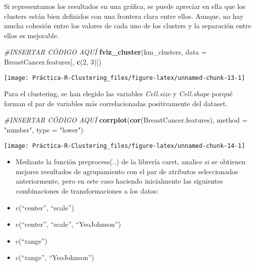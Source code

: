 \documentclass[
]{article}
\newenvironment{Shaded}{\begin{snugshade}}{\end{snugshade}}
\newcommand{\CommentTok}[1]{\textcolor[rgb]{0.56,0.35,0.01}{\textit{#1}}}
\newcommand{\DataTypeTok}[1]{\textcolor[rgb]{0.13,0.29,0.53}{#1}}
\newcommand{\DecValTok}[1]{\textcolor[rgb]{0.00,0.00,0.81}{#1}}
\newcommand{\KeywordTok}[1]{\textcolor[rgb]{0.13,0.29,0.53}{\textbf{#1}}}
\newcommand{\NormalTok}[1]{#1}
\newcommand{\StringTok}[1]{\textcolor[rgb]{0.31,0.60,0.02}{#1}}
\providecommand{\tightlist}{%
  \setlength{\itemsep}{0pt}\setlength{\parskip}{0pt}}
\begin{document}
Si representamos los resultados en una gráfica, se puede apreciar en
ella que los clusters están bien definidos con una frontera clara entre
ellos. Aunque, no hay mucha cohesión entre los valores de cada uno de
los clusters y la separación entre ellos es mejorable.

\begin{Shaded}
\begin{Highlighting}[]
\CommentTok{#INSERTAR CÓDIGO AQUÍ}
\KeywordTok{fviz_cluster}\NormalTok{(km_clusters, }\DataTypeTok{data =}\NormalTok{ BreastCancer.features[, }\KeywordTok{c}\NormalTok{(}\DecValTok{2}\NormalTok{, }\DecValTok{3}\NormalTok{)])}
\end{Highlighting}
\end{Shaded}

\begin{center}\texttt{[image: Práctica-R-Clustering\_files/figure-latex/unnamed-chunk-13-1]} \end{center}

Para el clustering, se han elegido las variables \emph{Cell.size} y
\emph{Cell.shape} porqué forman el par de variables más correlacionadas
positivamente del dataset.

\begin{Shaded}
\begin{Highlighting}[]
\CommentTok{#INSERTAR CÓDIGO AQUÍ}
\KeywordTok{corrplot}\NormalTok{(}\KeywordTok{cor}\NormalTok{(BreastCancer.features), }\DataTypeTok{method =} \StringTok{"number"}\NormalTok{, }\DataTypeTok{type =} \StringTok{"lower"}\NormalTok{)}
\end{Highlighting}
\end{Shaded}

\begin{center}\texttt{[image: Práctica-R-Clustering\_files/figure-latex/unnamed-chunk-14-1]} \end{center}

\begin{itemize}
\tightlist
\item
  Mediante la función preprocess(..) de la librería caret, analice si se
  obtienen mejores resultados de agrupamiento con el par de atributos
  seleccionados anteriormente, pero en este caso haciendo inicialmente
  las siguientes combinaciones de transformaciones a los datos:
\end{itemize}

\newpage

\begin{itemize}
\tightlist
\item
  c(``center'', ``scale'')
\item
  c(``center'', ``scale'', ``YeoJohnson'')
\item
  c(``range'')
\item
  c(``range'', ``YeoJohnson'')
\end{itemize}
\end{document}
